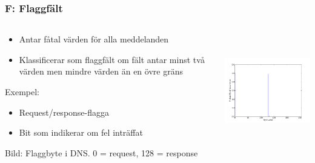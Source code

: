 \documentclass[xetex, 8pt]{beamer}
\begin{document}
    \begin{frame}
        \frametitle{F: Flaggfält}
        \begin{columns}[t]
            \begin{column}[T]{6cm}
                \begin{itemize}
                    \item Antar fåtal värden för alla meddelanden
                    \item Klassificerar som flaggfält om fält antar minst
                        två värden men mindre värden än en övre gräns
                \end{itemize}
                Exempel:
                \begin{itemize}
                    \item Request/response-flagga
                    \item Bit som indikerar om fel inträffat
                \end{itemize}
                Bild: Flaggbyte i DNS. 0 = request, 128 = response
            \end{column}
            \begin{column}[T]{6cm}
                \includegraphics[height=5cm]{img/flag.pdf}
            \end{column}
        \end{columns}
    \end{frame}
\end{document}
